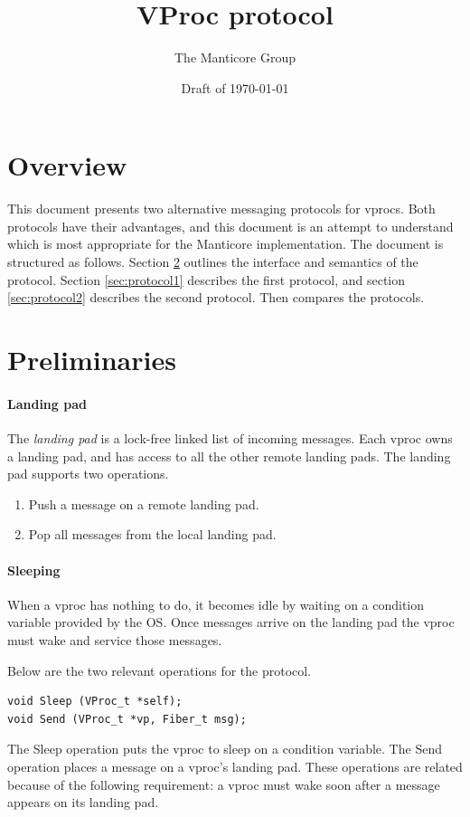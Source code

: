 \documentclass[11pt]{article}
\title{VProc protocol}
\author{The Manticore Group}
\date{Draft of \today}
\begin{document}
\maketitle

\section{Overview}
This document presents two alternative messaging protocols for vprocs.
Both protocols have their advantages, and this document is an attempt to understand
which is most appropriate for the Manticore implementation.
The document is structured as follows.
Section \ref{sec:preliminaries} outlines the interface and semantics of the protocol.
Section \ref{sec:protocol1} describes the first protocol, and section
\ref{sec:protocol2} describes the second protocol.
Then  compares the protocols.

\section{Preliminaries}\label{sec:preliminaries}

\paragraph{Landing pad}
The \emph{landing pad} is a lock-free linked list of incoming messages.
Each vproc owns a landing pad, and has access to all the other remote landing pads.
The landing pad supports two operations.
\begin{enumerate}
  \item Push a message on a remote landing pad.
  \item Pop all messages from the local landing pad.
\end{enumerate}

\paragraph{Sleeping}
When a vproc has nothing to do, it becomes idle by waiting on a condition variable
provided by the OS.
Once messages arrive on the landing pad the vproc must wake and service those messages.

Below are the two relevant operations for the protocol.
\lstset{language=C}
\lstset{commentstyle=\textit}
\begin{lstlisting}
void Sleep (VProc_t *self);
void Send (VProc_t *vp, Fiber_t msg);
\end{lstlisting}
The Sleep operation puts the vproc to sleep on a condition variable.
The Send operation places a message on a vproc's landing pad.
These operations are related because of the following requirement: a vproc must wake
soon after a message appears on its landing pad.
\end{document}
